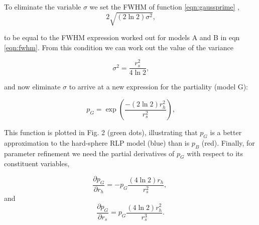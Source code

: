 \documentclass[12pt, letterpaper]{article}
\begin{document}
To eliminate the variable $\sigma$ we set the FWHM of function \eqref{eqn:gaussprime} ,
   \begin{equation}
   2 \sqrt{(2 \ln{2})\sigma^2}
    \text{,}
    \label{eqn:fwhmgaussprime}
  \end{equation}

to be equal to the FWHM expression worked out for models A and B in eqn \eqref{eqn:fwhm}. From this 
condition we can work out the value of the variance

   \begin{equation}
   \sigma^2 = 
    \dfrac {r_s^2} {4\ln{2}}
    \text{,}
    \label{eqn:gsigma}
  \end{equation}

and now eliminate $\sigma$ to arrive at a new expression for the partiality (model G):

   \begin{equation}
  p_G = 
    \exp( \dfrac {-(2 \ln{2}) r_h^2} {r_s^2}
    )
    \text{,}
    \label{eqn:pg}
  \end{equation}

This function is plotted in Fig. 2 (green dots), illustrating that $p_G$ is a better 
approximation to the 
hard-sphere RLP model (blue) than is $p_B$ (red).  Finally, for parameter refinement we need the 
partial derivatives of $p_G$ with respect to its constituent variables,

  \begin{equation}
    \frac{\partial{p_G}}{\partial{r_h}} = 
    - p_G \frac {(4 \ln{2}) r_h}{r_s^2}
    \text{, }
    \label{eqn:dpG_drh}
  \end{equation}
and
  \begin{equation}
    \frac{\partial{p_G}}{\partial{r_s}} = p_G\frac{(4 \ln{2})r_h^2}{r_s^3}
    \text{.}
    \label{eqn:dpG_drs}
  \end{equation}

  
\end{document}
